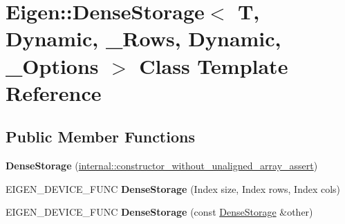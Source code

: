 \hypertarget{class_eigen_1_1_dense_storage_3_01_t_00_01_dynamic_00_01___rows_00_01_dynamic_00_01___options_01_4}{}\section{Eigen\+::Dense\+Storage$<$ T, Dynamic, \+\_\+\+Rows, Dynamic, \+\_\+\+Options $>$ Class Template Reference}
\label{class_eigen_1_1_dense_storage_3_01_t_00_01_dynamic_00_01___rows_00_01_dynamic_00_01___options_01_4}
\subsection*{Public Member Functions}
\begin{DoxyCompactItemize}
\item 
\mbox{\label{class_eigen_1_1_dense_storage_3_01_t_00_01_dynamic_00_01___rows_00_01_dynamic_00_01___options_01_4_aa0d4588f7ac79f2181d1cfd0cdb29967}} 
{\bfseries Dense\+Storage} (\mbox{\hyperlink{struct_eigen_1_1internal_1_1constructor__without__unaligned__array__assert}{internal\+::constructor\+\_\+without\+\_\+unaligned\+\_\+array\+\_\+assert}})
\item 
\mbox{\label{class_eigen_1_1_dense_storage_3_01_t_00_01_dynamic_00_01___rows_00_01_dynamic_00_01___options_01_4_ae63d1dfa7943f0a16580badef036abdc}} 
E\+I\+G\+E\+N\+\_\+\+D\+E\+V\+I\+C\+E\+\_\+\+F\+U\+NC {\bfseries Dense\+Storage} (Index size, Index rows, Index cols)
\item 
\mbox{\label{class_eigen_1_1_dense_storage_3_01_t_00_01_dynamic_00_01___rows_00_01_dynamic_00_01___options_01_4_ad24d636d0fbfd39e41e1f66a571e93c6}} 
E\+I\+G\+E\+N\+\_\+\+D\+E\+V\+I\+C\+E\+\_\+\+F\+U\+NC {\bfseries Dense\+Storage} (const \mbox{\hyperlink{class_eigen_1_1_dense_storage}{Dense\+Storage}} \&other)
\item 
\mbox{\label{class_eigen_1_1_dense_storage_3_01_t_00_01_dynamic_00_01___rows_00_01_dynamic_00_01___options_01_4_aa644dca466560cd132e9d211b66c606a}} 

\end{DoxyCompactItemize}
